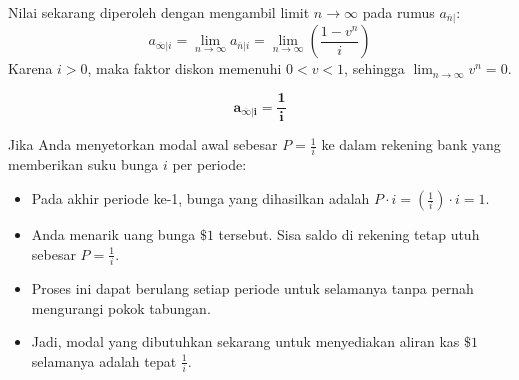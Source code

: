 \documentclass[11pt,a4paper]{article}
\begin{document}
\begin{center}
\end{center}

Nilai sekarang diperoleh dengan mengambil limit $n \to \infty$ pada rumus $a_{\overline{n}|}$:
\begin{equation}
    a_{\overline{\infty}|i} = \lim_{n \to \infty} a_{\overline{n}|i} = \lim_{n \to \infty} \left( \frac{1 - v^n}{i} \right)
\end{equation}
Karena $i > 0$, maka faktor diskon memenuhi $0 < v < 1$, sehingga $\lim_{n \to \infty} v^n = 0$.

\begin{definitionbox}
\begin{equation}
    \mathbf{a_{\overline{\infty}|i} = \frac{1}{i}}
\end{equation}
\end{definitionbox}

\begin{notebox}[Intuisi Finansial: Mengapa $a_{\overline{\infty}|} = \frac{1}{i}$?]
Jika Anda menyetorkan modal awal sebesar $P = \frac{1}{i}$ ke dalam rekening bank yang memberikan suku bunga $i$ per periode:
\begin{itemize}
    \item Pada akhir periode ke-1, bunga yang dihasilkan adalah $P \cdot i = \left(\frac{1}{i}\right) \cdot i = 1$.
    \item Anda menarik uang bunga $\$1$ tersebut. Sisa saldo di rekening tetap utuh sebesar $P = \frac{1}{i}$.
    \item Proses ini dapat berulang setiap periode untuk selamanya tanpa pernah mengurangi pokok tabungan.
    \item Jadi, modal yang dibutuhkan sekarang untuk menyediakan aliran kas $\$1$ selamanya adalah tepat $\frac{1}{i}$.
\end{itemize}
\end{notebox}
\end{document}
